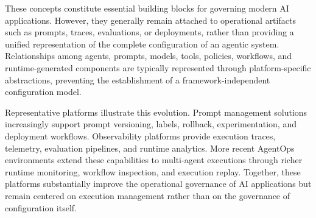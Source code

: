 \documentclass[10pt]{article}
\begin{document}
These concepts constitute essential building blocks for governing modern AI applications. However, they generally remain attached to operational artifacts such as prompts, traces, evaluations, or deployments, rather than providing a unified representation of the complete configuration of an agentic system. Relationships among agents, prompts, models, tools, policies, workflows, and runtime-generated components are typically represented through platform-specific abstractions, preventing the establishment of a framework-independent configuration model.

Representative platforms illustrate this evolution. Prompt management solutions increasingly support prompt versioning, labels, rollback, experimentation, and deployment workflows. Observability platforms provide execution traces, telemetry, evaluation pipelines, and runtime analytics. More recent AgentOps environments extend these capabilities to multi-agent executions through richer runtime monitoring, workflow inspection, and execution replay. Together, these platforms substantially improve the operational governance of AI applications but remain centered on execution management rather than on the governance of configuration itself.
\end{document}

